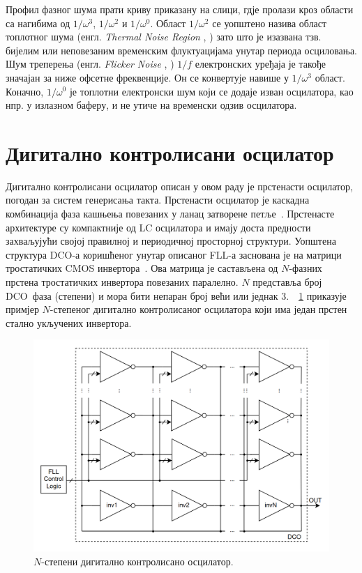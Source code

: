 \documentclass[master]{finthesis}
\makeatletter
\newcommand*{\engl}[2][\@empty]{%
    \edef\theacronym{#1}%
    (енгл. \foreignlanguage{english}{\emph{#2}%
    \ifx\theacronym\@empty \else , #1\fi})%
}
\def \FLL  {FLL} %
\def \DCO  {DCO} %
\makeatother
\begin{document}
Профил фазног шума прати криву приказану на слици, гдје пролази кроз области са нагибима од $1/\omega^{3}$, $1/\omega^{2}$ и $1/\omega^{0}$. Област $1/\omega^{2}$ се уопштено назива област топлотног шума \engl{Thermal Noise Region} зато што је изазвана тзв. бијелим или неповезаним временским флуктуацијама унутар периода осциловања. Шум треперења \engl{Flicker Noise} $1/f$ електронских уређаја је такође значајан за ниже офсетне фреквенције. Он се конвертује навише у $1/\omega^{3}$ област. Коначно, $1/\omega^{0}$ је топлотни електронски шум који се додаје изван осцилатора, као нпр. у излазном баферу, и не утиче на временски одзив осцилатора. 

\section{Дигитално контролисани осцилатор} \label{DCO chapter}
Дигитално контролисани осцилатор описан у овом раду је прстенасти осцилатор, погодан за систем генерисања такта. Прстенасти осцилатор је каскадна комбинација фаза кашњења повезаних у ланац затворене петље~\cite{Madhusudhana:283751064}. Прстенасте архитектуре су компактније од LC осцилатора и имају доста предности захваљујући својој правилној и периодичној просторној структури. Уопштена структура \DCO-а коришћеног унутар описаног \FLL-а заснована је на матрици тростатичких CMOS инвертора~\cite{Terosiet:340277809}. Ова матрица је састављена од $N$-фазних прстена тростатичких инвертора повезаних паралелно. $N$ представља број \DCO\ фаза (степени) и мора бити непаран број већи или једнак 3.~\figurename~\ref{dco_1} приказује примјер $N$-степеног дигитално контролисаног осцилатора који има један прстен стално укључених инвертора. \par
\begin{figure}[!ht]
	 \centering
	 \includegraphics[scale=0.25]{slike/dco_1.png}
	 \caption{$N$-степени дигитално контролисано осцилатор.}
	 \label{dco_1}
\end{figure}
\end{document}
